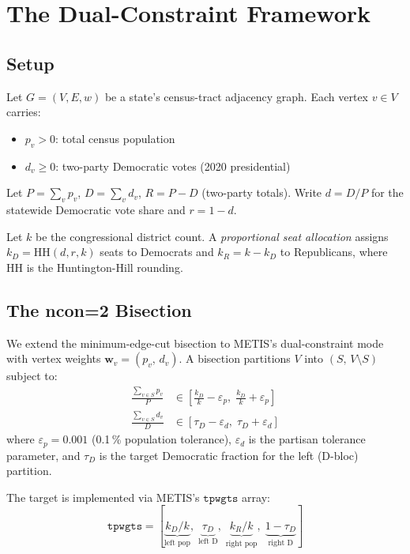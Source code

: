 \section{The Dual-Constraint Framework}
\label{sec:framework}

\subsection{Setup}

Let $G = (V, E, w)$ be a state's census-tract adjacency graph.
Each vertex $v \in V$ carries:
\begin{itemize}
  \item $p_v > 0$: total census population
  \item $d_v \geq 0$: two-party Democratic votes (2020 presidential)
\end{itemize}

Let $P = \sum_v p_v$, $D = \sum_v d_v$, $R = P - D$ (two-party totals).
Write $d = D/P$ for the statewide Democratic vote share and $r = 1 - d$.

Let $k$ be the congressional district count.
A \emph{proportional seat allocation} assigns $k_D = \mathrm{HH}(d, r, k)$
seats to Democrats and $k_R = k - k_D$ to Republicans, where $\mathrm{HH}$
is the Huntington-Hill rounding.

\subsection{The ncon=2 Bisection}

We extend the minimum-edge-cut bisection to METIS's dual-constraint mode with
vertex weights $\mathbf{w}_v = (p_v,\, d_v)$.
A bisection partitions $V$ into $(S,\, V \setminus S)$ subject to:
\begin{align}
  \frac{\sum_{v \in S} p_v}{P} &\in \left[\frac{k_D}{k} - \varepsilon_p,\; \frac{k_D}{k} + \varepsilon_p\right] \label{eq:pop-balance}\\
  \frac{\sum_{v \in S} d_v}{D} &\in \left[\tau_D - \varepsilon_d,\; \tau_D + \varepsilon_d\right] \label{eq:dem-balance}
\end{align}
where $\varepsilon_p = 0.001$ (0.1\,\% population tolerance), $\varepsilon_d$ is
the partisan tolerance parameter, and $\tau_D$ is the target Democratic fraction
for the left (D-bloc) partition.

The target is implemented via METIS's $\mathtt{tpwgts}$ array:
\[
  \mathtt{tpwgts} = [\underbrace{k_D/k}_{\text{left pop}},\; \underbrace{\tau_D}_{\text{left D}},\;
                     \underbrace{k_R/k}_{\text{right pop}},\; \underbrace{1-\tau_D}_{\text{right D}}]
\]

